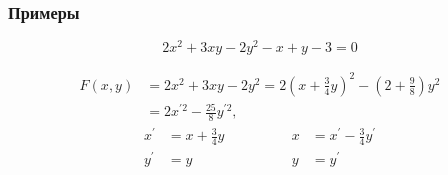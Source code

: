 \documentclass[10pt]{beamer}
\begin{document}
    \begin{frame}
        \frametitle{Примеры}
        \begin{equation}
            2x^2+3x y-2y^2-x+y-3=0
        \end{equation}
    
        \begin{equation}
            \begin{aligned}
                F(x,y) & = 2x^2 + 3x y-2y^2 = 2\left(x + \frac{3}{4}y \right)^2 - \left(2 + \frac{9}{8}\right)y^2 \\
                & = 2x^{\prime 2} - \frac{25}{8} y^{\prime 2},
            \end{aligned}
        \end{equation} 
        \begin{equation}
            \begin{aligned}
                x^\prime & = x + \frac{3}{4}y \\
                y^\prime & = y
            \end{aligned}
            \qquad
            \qquad
            \begin{aligned}
                x & = x^\prime - \frac{3}{4}y^\prime \\
                y & = y^\prime
            \end{aligned}
        \end{equation}
    \end{frame}
    
\end{document}
